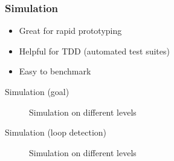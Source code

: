 \documentclass{beamer}
\begin{document}
\begin{frame}
\frametitle{Simulation}
\begin{itemize}
\item Great for rapid prototyping
\item Helpful for TDD (automated test suites)
\item Easy to benchmark
\end{itemize}
\end{frame}

\begin{frame}{Simulation (goal)}
\begin{figure}[h!]
\centering    
{}
  \caption{Simulation on different levels}
 \end{figure} 
  \end{frame}
  
\begin{frame}{Simulation (loop detection)}
\begin{figure}[h!]
\centering    
{}
  \caption{Simulation on different levels}
 \end{figure} 
  \end{frame}
\end{document}
